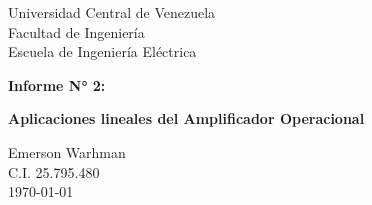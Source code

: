 \begin{titlepage}
    \centering
    \Large
    Universidad Central de Venezuela\\
    Facultad de Ingeniería\\
    Escuela de Ingeniería Eléctrica
    \vspace*{8cm}

    \Huge
    \textbf{Informe N° 2: } 

    \textbf{Aplicaciones lineales del Amplificador Operacional}
    \vfill


    \Large

    Emerson Warhman \\
    C.I. 25.795.480 \\
    \today

\end{titlepage}